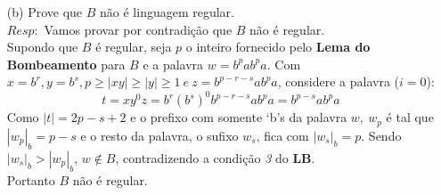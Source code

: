 \documentclass{homework}
\begin{document}
\pagebreak

	\begin{enumerate}
		\item[(b)] Prove que $B$ não é linguagem regular.\\
		$Resp:$ Vamos provar por contradição que $B$ não é regular.\\
			Supondo que $B$ é regular, seja $p$ o inteiro fornecido pelo \textbf{Lema do Bombeamento} para $B$ e a palavra $w = b^pab^pa$. Com $x = b^r, y = b^{s}, p \geq |xy| \geq |y| \geq 1\ e\ z = b^{p-r-s}ab^pa$, considere a palavra ($i = 0$):
			\[t = xy^0z = b^r(b^s)^0b^{p-r-s}ab^pa = b^{p-s}ab^pa\]
			Como $|t|=2p-s+2$ e o prefixo com somente `b's da palavra $w,\ w_p$ é tal que $|w_p|_b = p - s$ e o resto da palavra, o sufixo $w_s$, fica com $|w_s|_b = p$. Sendo $|w_s|_b > |w_p|_b$, $w \notin B$, contradizendo a condição \textit{3} do \textbf{LB}.\\
			Portanto $B$ não é regular.
	\end{enumerate}
	
\end{document}

